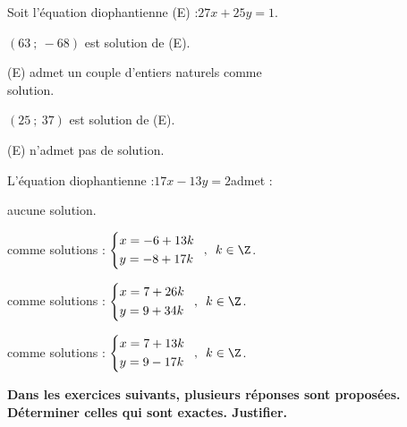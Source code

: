 \begin{QCM}
\begin{GroupeQCM}

\begin{exercice}
Soit l'équation diophantienne (E) :\enskip $27x+25y=1$. 
\begin{ChoixQCM}{2}
\item $(63\ ;\ -68)$ est solution de (E).
\item (E) admet un couple d'entiers naturels comme\\ solution.
\item $(25\ ;\ 37)$ est solution de (E).
\item (E) n'admet pas de solution.
\end{ChoixQCM}
\end{exercice}
\begin{corrige}
\end{corrige}
\begin{exercice}
L'équation diophantienne :\enskip $17x-13y=2$\enskip admet :
\begin{ChoixQCM}{2}
\item aucune solution.
\item comme solutions : \enskip $\left\{\begin{aligned}
&x=-6+13k\\
&y=-8+17k\end{aligned}\right.\enskip,\enskip k\in\Z$.
\item comme solutions : \enskip $\left\{\begin{aligned}
&x=7+26k\\
&y=9+34k\end{aligned}\right.\enskip,\enskip k\in\Z$.\vspace{5pt}
\item comme solutions : \enskip $\left\{\begin{aligned}
&x=7+13k\\
&y=9-17k\end{aligned}\right.\enskip,\enskip k\in\Z$.
\end{ChoixQCM}
\end{exercice}
\begin{corrige}
\end{corrige}
\end{GroupeQCM}
\end{QCM}\vspace{0.5cm}

\textbf{Dans les exercices suivants, plusieurs réponses sont proposées. Déterminer celles qui sont exactes. Justifier.}

